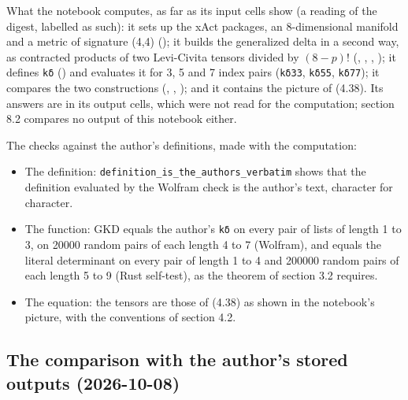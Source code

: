 \documentclass[11pt]{article}
\begin{document}
What the notebook computes, as far as its input cells show (a reading of the digest, labelled as such): it sets up the xAct packages, an 8-dimensional manifold and a metric of signature (4,4) (\texttt{}); it builds the generalized delta in a second way, as contracted products of two Levi-Civita tensors divided by $(8 - p)!$ (\texttt{}, \texttt{}, \texttt{}, \texttt{}); it defines \texttt{kδ} (\texttt{}) and evaluates it for 3, 5 and 7 index pairs (\texttt{kδ33}, \texttt{kδ55}, \texttt{kδ77}); it compares the two constructions (\texttt{}, \texttt{}, \texttt{}); and it contains the picture of (4.38). Its answers are in its output cells, which were not read for the computation; section 8.2 compares no output of this notebook either.

The checks against the author's definitions, made with the computation:

\begin{itemize}
\item The definition: \texttt{definiti\allowbreak{}on\_is\_th\allowbreak{}e\_author\allowbreak{}s\_verbat\allowbreak{}im} shows that the definition evaluated by the Wolfram check is the author's text, character for character.
\item The function: GKD equals the author's \texttt{kδ} on every pair of lists of length 1 to 3, on 20000 random pairs of each length 4 to 7 (Wolfram), and equals the literal determinant on every pair of length 1 to 4 and 200000 random pairs of each length 5 to 9 (Rust self-test), as the theorem of section 3.2 requires.
\item The equation: the tensors are those of (4.38) as shown in the notebook's picture, with the conventions of section 4.2.
\end{itemize}

\subsection{The comparison with the author's stored outputs (2026-10-08)}
\end{document}
